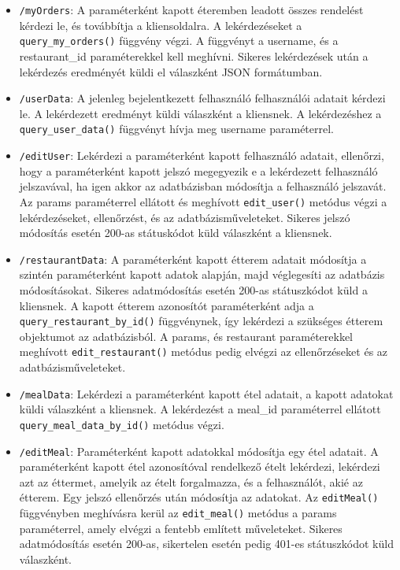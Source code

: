 \begin{itemize}
\item \texttt{/myOrders}:
A paraméterként kapott éteremben leadott összes rendelést kérdezi le, és továbbítja a kliensoldalra. A lekérdezéseket a \texttt{query\_my\_orders()} függvény végzi. A függvényt a username, és a restaurant\_id paraméterekkel kell meghívni. Sikeres lekérdezések után a lekérdezés eredményét küldi el válaszként JSON formátumban.
\item \texttt{/userData}:
A jelenleg bejelentkezett felhasználó felhasználói adatait kérdezi le. A lekérdezett eredményt küldi válaszként a kliensnek. A lekérdezéshez a \\ \texttt{query\_user\_data()} függvényt hívja meg username paraméterrel.
\item \texttt{/editUser}:
Lekérdezi a paraméterként kapott felhasználó adatait, ellenőrzi, hogy a paraméterként kapott jelszó megegyezik e a lekérdezett felhasználó jelszavával, ha igen akkor az adatbázisban módosítja a felhasználó jelszavát. Az params paraméterrel ellátott és meghívott \texttt{edit\_user()} metódus végzi a lekérdezéseket, ellenőrzést, és az adatbázisműveleteket. Sikeres jelszó módosítás esetén 200-as státuskódot küld válaszként a kliensnek.
\item \texttt{/restaurantData}:
A paraméterként kapott étterem adatait módosítja a szintén paraméterként kapott adatok alapján, majd véglegesíti az adatbázis módosításokat. Sikeres adatmódosítás esetén 200-as státuszkódot küld a kliensnek. A kapott étterem azonosítót paraméterként adja a \texttt{query\_restaurant\_by\_id()} függvénynek, így lekérdezi a szükséges étterem objektumot az adatbázisból. A params, és restaurant paraméterekkel meghívott \texttt{edit\_restaurant()} metódus pedig elvégzi az ellenőrzéseket és az adatbázisműveleteket.
\item \texttt{/mealData}:
Lekérdezi a paraméterként kapott étel adatait, a kapott adatokat küldi válaszként a kliensnek. A lekérdezést a meal\_id paraméterrel ellátott \\ \texttt{query\_meal\_data\_by\_id()} metódus végzi.
\item \texttt{/editMeal}:
Paraméterként kapott adatokkal módosítja egy étel adatait. A paraméterként kapott étel azonosítóval rendelkező ételt lekérdezi, lekérdezi azt az éttermet, amelyik az ételt forgalmazza, és a felhasználót, akié az étterem. Egy jelszó ellenőrzés után módosítja az adatokat. Az \texttt{editMeal()} függvényben meghívásra kerül az \texttt{edit\_meal()} metódus a params paraméterrel, amely elvégzi a fentebb említett műveleteket. Sikeres adatmódosítás esetén 200-as, sikertelen esetén pedig 401-es státuszkódot küld válaszként.

\end{itemize}
